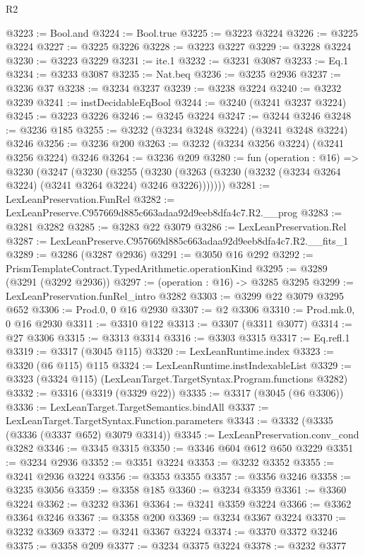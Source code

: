\begin{lexlean}{R2}
\begin{coremodule}
@3223 := Bool.and
@3224 := Bool.true
@3225 := @3223 @3224
@3226 := @3225 @3224
@3227 := @3225 @3226
@3228 := @3223 @3227
@3229 := @3228 @3224
@3230 := @3223 @3229
@3231 := ite.{1}
@3232 := @3231 @3087
@3233 := Eq.{1}
@3234 := @3233 @3087
@3235 := Nat.beq
@3236 := @3235 @2936
@3237 := @3236 @37
@3238 := @3234 @3237
@3239 := @3238 @3224
@3240 := @3232 @3239
@3241 := instDecidableEqBool
@3244 := @3240 (@3241 @3237 @3224)
@3245 := @3223 @3226
@3246 := @3245 @3224
@3247 := @3244 @3246
@3248 := @3236 @185
@3255 := @3232 (@3234 @3248 @3224) (@3241 @3248 @3224) @3246
@3256 := @3236 @200
@3263 := @3232 (@3234 @3256 @3224) (@3241 @3256 @3224) @3246
@3264 := @3236 @209
@3280 := fun (operation : @16) =>
  @3230
    (@3247
      (@3230
        (@3255
          (@3230 (@3263 (@3230 (@3232 (@3234 @3264 @3224) (@3241 @3264 @3224) @3246 @3226)))))))
@3281 := LexLeanPreservation.FunRel
@3282 := LexLeanPreserve.C957669d885c663adaa92d9eeb8dfa4c7.R2.__prog
@3283 := @3281 @3282
@3285 := @3283 @22 @3079
@3286 := LexLeanPreservation.Rel
@3287 := LexLeanPreserve.C957669d885c663adaa92d9eeb8dfa4c7.R2.__fits_1
@3289 := @3286 (@3287 @2936)
@3291 := @3050 @16 @292
@3292 := PrismTemplateContract.TypedArithmetic.operationKind
@3295 := @3289 (@3291 (@3292 @2936))
@3297 := (operation : @16) -> @3285 @3295
@3299 := LexLeanPreservation.funRel_intro @3282
@3303 := @3299 @22 @3079 @3295 @652
@3306 := Prod.{0, 0} @16 @2930
@3307 := @2 @3306
@3310 := Prod.mk.{0, 0} @16 @2930
@3311 := @3310 @122
@3313 := @3307 (@3311 @3077)
@3314 := @27 @3306
@3315 := @3313 @3314
@3316 := @3303 @3315
@3317 := Eq.refl.{1}
@3319 := @3317 (@3045 @115)
@3320 := LexLeanRuntime.index
@3323 := @3320 (@6 @115) @115
@3324 := LexLeanRuntime.instIndexableList
@3329 := @3323 (@3324 @115) (LexLeanTarget.TargetSyntax.Program.functions @3282)
@3332 := @3316 (@3319 (@3329 @22))
@3335 := @3317 (@3045 (@6 @3306))
@3336 := LexLeanTarget.TargetSemantics.bindAll
@3337 := LexLeanTarget.TargetSyntax.Function.parameters
@3343 := @3332 (@3335 (@3336 (@3337 @652) @3079 @3314))
@3345 := LexLeanPreservation.conv_cond @3282
@3346 := @3345 @3315
@3350 := @3346 @604 @612 @650 @3229
@3351 := @3234 @2936
@3352 := @3351 @3224
@3353 := @3232 @3352
@3355 := @3241 @2936 @3224
@3356 := @3353 @3355
@3357 := @3356 @3246
@3358 := @3235 @3056
@3359 := @3358 @185
@3360 := @3234 @3359
@3361 := @3360 @3224
@3362 := @3232 @3361
@3364 := @3241 @3359 @3224
@3366 := @3362 @3364 @3246
@3367 := @3358 @200
@3369 := @3234 @3367 @3224
@3370 := @3232 @3369
@3372 := @3241 @3367 @3224
@3374 := @3370 @3372 @3246
@3375 := @3358 @209
@3377 := @3234 @3375 @3224
@3378 := @3232 @3377

\end{coremodule}
\end{lexlean}
